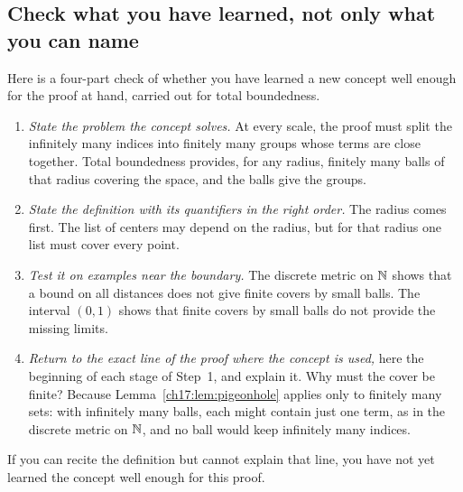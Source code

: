 \subsection*{Check what you have learned, not only what you can name}
Here is a four-part check of whether you have learned a new concept well enough for the proof at hand, carried out for total boundedness.
\begin{enumerate}
\item \emph{State the problem the concept solves.} At every scale, the proof must split the infinitely many indices into finitely many groups whose terms are close together. Total boundedness provides, for any radius, finitely many balls of that radius covering the space, and the balls give the groups.
\item \emph{State the definition with its quantifiers in the right order.} The radius comes first. The list of centers may depend on the radius, but for that radius one list must cover every point.
\item \emph{Test it on examples near the boundary.} The discrete metric on $\mathbb N$ shows that a bound on all distances does not give finite covers by small balls. The interval $(0,1)$ shows that finite covers by small balls do not provide the missing limits.
\item \emph{Return to the exact line of the proof where the concept is used,} here the beginning of each stage of Step~1, and explain it. Why must the cover be finite? Because Lemma~\ref{ch17:lem:pigeonhole} applies only to finitely many sets: with infinitely many balls, each might contain just one term, as in the discrete metric on $\mathbb N$, and no ball would keep infinitely many indices.
\end{enumerate}
If you can recite the definition but cannot explain that line, you have not yet learned the concept well enough for this proof.

